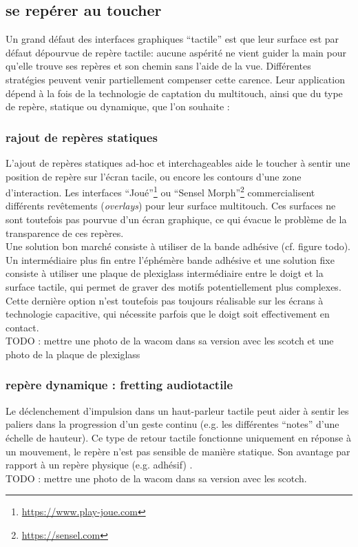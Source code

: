 \subsection{se repérer au toucher}
Un grand défaut des interfaces graphiques ``tactile'' est que leur surface est par défaut dépourvue de repère tactile: aucune aspérité ne vient guider la main pour qu'elle trouve ses repères et son chemin sans l'aide de la vue. Différentes stratégies peuvent venir partiellement compenser cette carence. Leur application dépend à la fois de la technologie de captation du multitouch, ainsi que du type de repère, statique ou dynamique, que l'on souhaite :

\subsubsection{rajout de repères statiques}
L'ajout de repères statiques ad-hoc et interchageables aide le toucher à sentir une position de repère sur l'écran tacile, ou encore les contours d'une zone d'interaction. Les interfaces ``Joué''\footnote{\url{https://www.play-joue.com}} ou ``Sensel Morph''\footnote{\url{https://sensel.com}} commercialisent différents revêtements (\textit{overlays}) pour leur surface multitouch. Ces surfaces ne sont toutefois pas pourvue d'un écran graphique, ce qui évacue le problème de la transparence de ces repères.\\
Une solution bon marché consiste à utiliser de la bande adhésive (cf. figure todo). Un intermédiaire plus fin entre l'éphémère bande adhésive et une solution fixe consiste à utiliser une plaque de plexiglass intermédiaire entre le doigt et la surface tactile, qui permet de graver des motifs potentiellement plus complexes. Cette dernière option n'est toutefois pas toujours réalisable sur les écrans à technologie capacitive, qui nécessite parfois que le doigt soit effectivement en contact.\\


TODO : mettre une photo de la wacom dans sa version avec les scotch et une photo de la plaque de plexiglass


\subsubsection{repère dynamique : fretting audiotactile}
Le déclenchement d'impulsion dans un haut-parleur tactile peut aider à sentir les paliers dans la progression d'un geste continu (e.g. les différentes ``notes'' d'une échelle de hauteur). Ce type de retour tactile fonctionne uniquement en réponse à un mouvement, le repère n'est pas sensible de manière statique. Son avantage par rapport à un repère physique (e.g. adhésif) .\\
TODO : mettre une photo de la wacom dans sa version avec les scotch.


